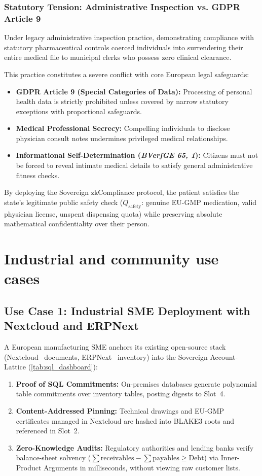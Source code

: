 \documentclass[a4paper,11pt,twoside,parskip=half-,headings=small]{scrartcl}
\begin{document}
\subsubsection{Statutory Tension: Administrative Inspection vs. GDPR Article 9}
Under legacy administrative inspection practice, demonstrating compliance with statutory pharmaceutical controls coerced individuals into surrendering their entire medical file to municipal clerks who possess zero clinical clearance.

This practice constitutes a severe conflict with core European legal safeguards:
\begin{itemize}
  \item \textbf{GDPR Article 9 (Special Categories of Data):} Processing of personal health data is strictly prohibited unless covered by narrow statutory exceptions with proportional safeguards.
  \item \textbf{Medical Professional Secrecy:} Compelling individuals to disclose physician consult notes undermines privileged medical relationships.
  \item \textbf{Informational Self-Determination (\emph{BVerfGE 65, 1}):} Citizens must not be forced to reveal intimate medical details to satisfy general administrative fitness checks.
\end{itemize}

By deploying the Sovereign zkCompliance protocol, the patient satisfies the state's legitimate public safety check ($Q_{\text{safety}}$: genuine EU-GMP medication, valid physician license, unspent dispensing quota) while preserving absolute mathematical confidentiality over their person.



\section{Industrial and community use cases}
\label{sec:usecases}

\subsection{Use Case 1: Industrial SME Deployment with Nextcloud and ERPNext}

A European manufacturing SME anchors its existing open-source stack
(Nextcloud~\cite{nextcloud} documents, ERPNext~\cite{erpnext} inventory) into the
Sovereign Account-Lattice (\cref{tab:sql_dashboard}):
\begin{enumerate}
  \item \textbf{Proof of SQL Commitments:} On-premises databases generate polynomial table
commitments over inventory tables, posting digests to Slot~4.
  \item \textbf{Content-Addressed Pinning:} Technical drawings and EU-GMP certificates
managed in Nextcloud are hashed into BLAKE3 roots and referenced in Slot~2.
  \item \textbf{Zero-Knowledge Audits:} Regulatory authorities and lending banks verify
balance-sheet solvency ($\sum \text{receivables} - \sum \text{payables} \ge \text{Debt}$)
via Inner-Product Arguments in milliseconds, without viewing raw customer lists.
\end{enumerate}
\end{document}
